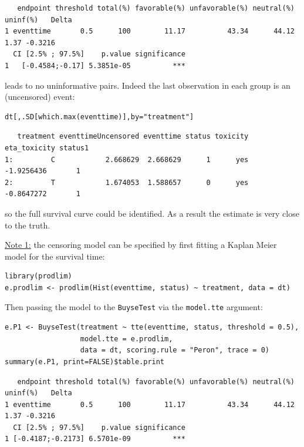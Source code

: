 \documentclass[12pt]{article}
\begin{document}
\begin{verbatim}
   endpoint threshold total(%) favorable(%) unfavorable(%) neutral(%) uninf(%)   Delta
1 eventtime       0.5      100        11.17          43.34      44.12     1.37 -0.3216
  CI [2.5% ; 97.5%]    p.value significance
1   [-0.4584;-0.17] 5.3851e-05          ***
\end{verbatim}

leads to no uninformative pairs. Indeed the last observation in each group is an (uncensored) event:
\lstset{language=r,label= ,caption= ,captionpos=b,numbers=none}
\begin{lstlisting}
dt[,.SD[which.max(eventtime)],by="treatment"]
\end{lstlisting}

\begin{verbatim}
   treatment eventtimeUncensored eventtime status toxicity eta_toxicity status1
1:         C            2.668629  2.668629      1      yes   -1.9256436       1
2:         T            1.674053  1.588657      0      yes   -0.8647272       1
\end{verbatim}

so the full survival curve could be identified. As a result the estimate is very close to the
truth. 

\bigskip

\uline{Note 1:} the censoring model can be specified by first fitting a
Kaplan Meier model for the survival time:
\lstset{language=r,label= ,caption= ,captionpos=b,numbers=none}
\begin{lstlisting}
library(prodlim)
e.prodlim <- prodlim(Hist(eventtime, status) ~ treatment, data = dt)
\end{lstlisting}

Then passing the model to the \texttt{BuyseTest} via the \texttt{model.tte} argument:
\lstset{language=r,label= ,caption= ,captionpos=b,numbers=none}
\begin{lstlisting}
e.P1 <- BuyseTest(treatment ~ tte(eventtime, status, threshold = 0.5),
                  model.tte = e.prodlim,
                  data = dt, scoring.rule = "Peron", trace = 0)
summary(e.P1, print=FALSE)$table.print
\end{lstlisting}

\begin{verbatim}
   endpoint threshold total(%) favorable(%) unfavorable(%) neutral(%) uninf(%)   Delta
1 eventtime       0.5      100        11.17          43.34      44.12     1.37 -0.3216
  CI [2.5% ; 97.5%]    p.value significance
1 [-0.4187;-0.2173] 6.5701e-09          ***
\end{verbatim}
\end{document}
